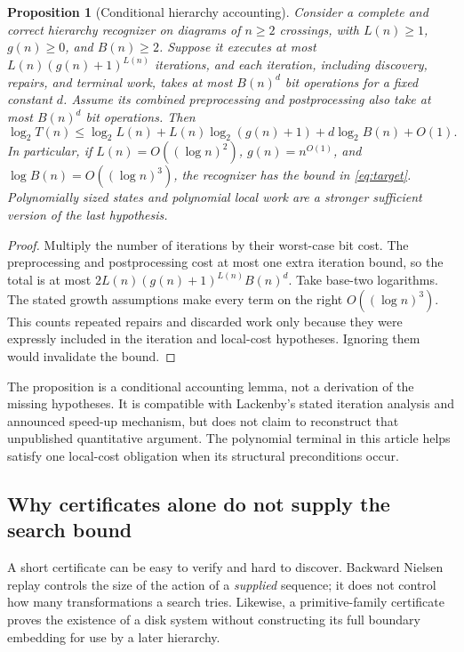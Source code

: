 \documentclass[11pt,a4paper]{article}
\newtheorem{proposition}[theorem]{Proposition}
\theoremstyle{definition}
\theoremstyle{remark}
\begin{document}
\begin{proposition}[Conditional hierarchy accounting]
\label{prop:global}
Consider a \emph{complete and correct} hierarchy recognizer on diagrams of
$n\ge2$ crossings, with $L(n)\ge1$, $g(n)\ge0$, and $B(n)\ge2$.
Suppose it executes at most $L(n)(g(n)+1)^{L(n)}$
iterations, and each iteration, including discovery, repairs, and terminal
work, takes at most $B(n)^d$ bit operations for a fixed constant $d$.
Assume its combined preprocessing and postprocessing also take at most
$B(n)^d$ bit operations.
Then
\begin{equation}
 \log_2 T(n)\le \log_2 L(n)+L(n)\log_2(g(n)+1)
                    +d\log_2 B(n)+O(1).
 \label{eq:account}
\end{equation}
In particular, if $L(n)=O((\log n)^2)$, $g(n)=n^{O(1)}$, and
$\log B(n)=O((\log n)^3)$, the recognizer has the bound in
\cref{eq:target}. Polynomially sized states and polynomial local work are
a stronger sufficient version of the last hypothesis.
\end{proposition}

\begin{proof}
Multiply the number of iterations by their worst-case bit cost. The
preprocessing and postprocessing cost at most one extra iteration bound,
so the total is at most $2L(n)(g(n)+1)^{L(n)}B(n)^d$.
Take base-two logarithms. The stated growth assumptions make every term on the
right $O((\log n)^3)$. This counts repeated repairs and discarded work only
because they were expressly included in the iteration and local-cost
hypotheses. Ignoring them would invalidate the bound.
\end{proof}

The proposition is a conditional accounting lemma, not a derivation of the
missing hypotheses. It is compatible with Lackenby's stated iteration
analysis and announced speed-up mechanism, but does not claim to reconstruct
that unpublished quantitative argument. The polynomial terminal in this
article helps satisfy one local-cost obligation when its structural
preconditions occur.

\subsection{Why certificates alone do not supply the search bound}

A short certificate can be easy to verify and hard to discover. Backward
Nielsen replay controls the size of the action of a \emph{supplied} sequence;
it does not control how many transformations a search tries. Likewise, a
primitive-family certificate proves the existence of a disk system without
constructing its full boundary embedding for use by a later hierarchy.
\end{document}
